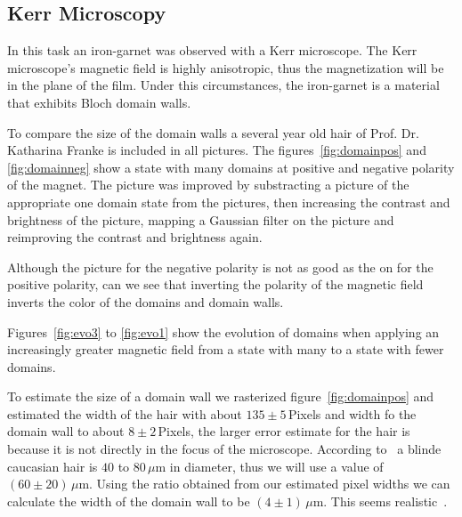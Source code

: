 \documentclass[a4paper,10pt]{scrartcl}
\begin{document}
\subsection{Kerr Microscopy}

In this task an iron-garnet was observed with a Kerr microscope. The Kerr microscope's magnetic field is highly anisotropic, thus the magnetization will be in the plane of the film. Under this circumstances, the iron-garnet is a material that exhibits Bloch domain walls. 

To compare the size of the domain walls a several year old hair of Prof. Dr. Katharina Franke is included in all pictures. The figures~\ref{fig:domainpos} and \ref{fig:domainneg} show a state with many domains at positive and negative polarity of the magnet. The picture was improved by substracting a picture of the appropriate one domain state from the pictures, then increasing the contrast and brightness of the picture, mapping a Gaussian filter on the picture and reimproving the contrast and brightness again. 

Although the picture for the negative polarity is not as good as the on for the positive polarity, can we see that inverting the polarity of the magnetic field inverts the color of the domains and domain walls.

Figures~\ref{fig:evo3} to \ref{fig:evo1} show the evolution of domains when applying an increasingly greater magnetic field from a state with many to a state with fewer domains.

To estimate the size of a domain wall we rasterized figure~\ref{fig:domainpos} and estimated the width  of the hair with about $135\pm5\,$Pixels and width fo the domain wall to about $8\pm2\,$Pixels, the larger error estimate for the hair is because it is not directly in the focus of the microscope.  According to~\cite{blume} a blinde caucasian hair is $40$ to $80\,\mu$m in diameter, thus we will use a value of $(60\pm 20)\,\mu$m. Using the ratio obtained from our estimated pixel widths we can calculate the width of the domain wall to be $(4\pm 1)\,\mu$m. This seems realistic~\cite{wiki}.
\end{document}
